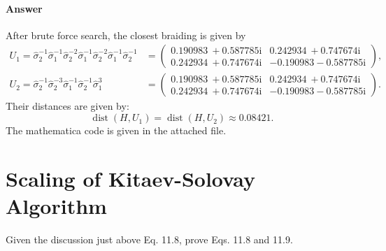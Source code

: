 \paragraph{Answer}
After brute force search, the closest braiding is given by
\begin{equation*}
\begin{aligned}
U_{1} =\hat{\sigma }_{2}^{-1}\hat{\sigma }_{1}^{-1}\hat{\sigma }_{2}^{-2}\hat{\sigma }_{1}^{-1}\hat{\sigma }_{2}^{-2}\hat{\sigma }_{1}^{-1}\hat{\sigma }_{2}^{-1} & =\begin{pmatrix}
0.190983\ +0.587785\mathrm{i} & 0.242934\ +0.747674\mathrm{i}\\
0.242934\ +0.747674\mathrm{i} & -0.190983-0.587785\mathrm{i}
\end{pmatrix} ,\\
U_{2} =\hat{\sigma }_{2}^{-1}\hat{\sigma }_{2}^{-3}\hat{\sigma }_{1}^{-1}\hat{\sigma }_{2}^{-1}\hat{\sigma }_{1}^{3} & =\begin{pmatrix}
0.190983\ +0.587785\mathrm{i} & 0.242934\ +0.747674\mathrm{i}\\
0.242934\ +0.747674\mathrm{i} & -0.190983-0.587785\mathrm{i}
\end{pmatrix} .
\end{aligned}
\end{equation*}
Their distances are given by:
\begin{equation*}
\operatorname{dist}( H,U_{1}) =\operatorname{dist}( H,U_{2}) \approx 0.08421.
\end{equation*}
The mathematica code is given in the attached file. 

\section{Scaling of Kitaev-Solovay Algorithm}
Given the discussion just above Eq. 11.8, prove Eqs. 11.8 and 11.9.

